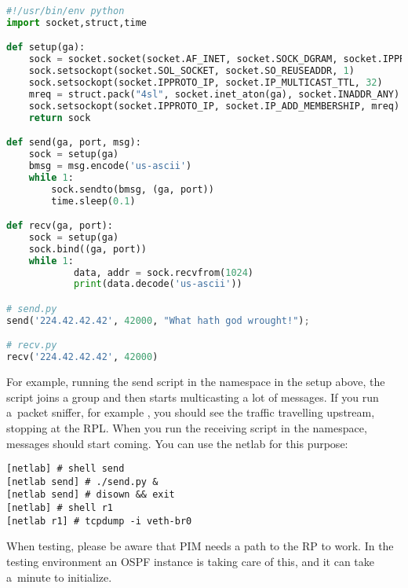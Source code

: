 \begin{lstlisting}[language=python]
#!/usr/bin/env python
import socket,struct,time

def setup(ga):
    sock = socket.socket(socket.AF_INET, socket.SOCK_DGRAM, socket.IPPROTO_UDP)
    sock.setsockopt(socket.SOL_SOCKET, socket.SO_REUSEADDR, 1)
    sock.setsockopt(socket.IPPROTO_IP, socket.IP_MULTICAST_TTL, 32)
    mreq = struct.pack("4sl", socket.inet_aton(ga), socket.INADDR_ANY)
    sock.setsockopt(socket.IPPROTO_IP, socket.IP_ADD_MEMBERSHIP, mreq)
    return sock

def send(ga, port, msg):
    sock = setup(ga)
    bmsg = msg.encode('us-ascii')
    while 1:
        sock.sendto(bmsg, (ga, port))
        time.sleep(0.1)

def recv(ga, port):
    sock = setup(ga)
    sock.bind((ga, port))
    while 1:
            data, addr = sock.recvfrom(1024)
            print(data.decode('us-ascii'))

# send.py
send('224.42.42.42', 42000, "What hath god wrought!");

# recv.py
recv('224.42.42.42', 42000)
\end{lstlisting}

\noindent For example, running the send script in the  namespace in the setup
above, the script joins a group and then starts multicasting a lot of messages.
If you run a~packet sniffer, for example , you should see the traffic
travelling upstream, stopping at the RPL. When you run the receiving script in
the  namespace, messages should start coming. You can use the netlab
for this purpose:

\begin{lstlisting}
[netlab] # shell send
[netlab send] # ./send.py &
[netlab send] # disown && exit
[netlab] # shell r1
[netlab r1] # tcpdump -i veth-br0
\end{lstlisting}

\noindent When testing, please be aware that PIM needs a path to the RP to work. In the
testing environment an OSPF instance is taking care of this, and it can take
a~minute to initialize.
